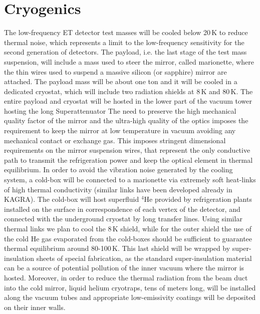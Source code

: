 \section{Cryogenics}
\label{Sec:Cryogenics}

The  low-frequency ET detector test masses will be cooled below 20\,K to reduce thermal noise, which represents a limit to the low-frequency sensitivity for the second generation of detectors.  The payload, i.e. the last stage of the test mass suspension, will include a mass used to steer the mirror, called marionette, where the thin wires used to suspend a massive silicon (or sapphire) mirror are attached. The payload mass will be about one ton and it will be cooled in a dedicated cryostat, which will include two radiation shields at 8\,K and 80\,K.  
The entire payload and cryostat will be hosted in the lower part of the vacuum tower hosting the long Superattenuator
 The need to preserve the high mechanical quality factor of the mirror and the ultra-high  quality of the optics imposes the requirement to keep the mirror at low temperature in vacuum avoiding any mechanical contact or exchange gas. %
 This imposes stringent dimensional requirements on the mirror suspension wires, that represent the only conductive path to transmit the refrigeration power and keep the optical element in thermal equilibrium. %
In order to avoid the vibration noise generated by the cooling system, a cold-box will be connected to a marionette via extremely soft heat-links of high thermal conductivity (similar links have been developed already in KAGRA). The cold-box will host superfluid $^4$He provided by refrigeration plants installed on the surface in correspondence of each vertex of the detector, and connected with %
the underground cryostat by long transfer lines. %
Using similar thermal links we plan to cool the 8\,K shield, while for the outer shield the use of the cold He gas evaporated from the cold-boxes should be sufficient to guarantee thermal equilibrium around 80-100\,K.
This last shield will be wrapped by super-insulation sheets of special fabrication, as the standard super-insulation material can be a source of potential pollution of the inner vacuum where the mirror is hosted. 
Moreover, in order to reduce the thermal radiation from the beam duct into the cold mirror, liquid helium cryotraps, tens of meters long, will be installed along the vacuum tubes and appropriate low-emissivity coatings will be deposited on their inner walls. 

